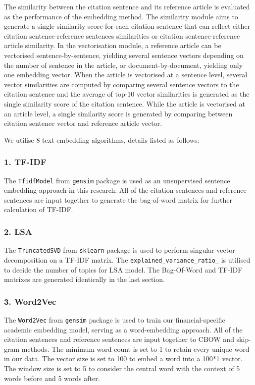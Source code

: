 The similarity between the citation sentence and its reference article is evaluated as the performance of the embedding method.
The similarity module aims to generate a single similarity score for each citation sentence that can reflect either citation sentence-reference sentences similarities or citation sentence-reference article similarity.
In the vectorisation module, a reference article can be vectorised sentence-by-sentence, yielding several sentence vectors depending on the number of sentence in the article, or document-by-document, yielding only one embedding vector.
When the article is vectorised at a sentence level, several vector similarities are computed by comparing several sentence vectors to the citation sentence and the average of top-10 vector similarities is generated as the single similarity score of the citation sentence.
While the article is vectorised at an article level, a single similarity score is generated by comparing between citation sentence vector and reference article vector.

We utilise 8 text embedding algorithms, details listed as follows:

\subsubsection{1. TF-IDF}
The \texttt{TfidfModel} from \texttt{gensim} package is used as an unsupervised sentence embedding approach in this research.
All of the citation sentences and reference sentences are input together to generate the bag-of-word matrix for further calculation of TF-IDF.

\subsubsection{2. LSA}
The \texttt{TruncatedSVD} from \texttt{sklearn} package is used to perform singular vector decomposition on a TF-IDF matrix.
The \texttt{explained_variance_ratio_} is utilised to decide the number of topics for LSA model.
The Bag-Of-Word and TF-IDF matrixes are generated identically in the last section.

\subsubsection{3. Word2Vec}
The \texttt{Word2Vec} from \texttt{gensim} package is used to train our financial-specific academic embedding model, serving as a word-embedding approach.
All of the citation sentences and reference sentences are input together to CBOW and skip-gram methods.
The minimum word count is set to 1 to retain every unique word in our data.
The vector size is set to 100 to embed a word into a 100*1 vector.
The window size is set to 5 to consider the central word with the context of 5 words before and 5 words after.

